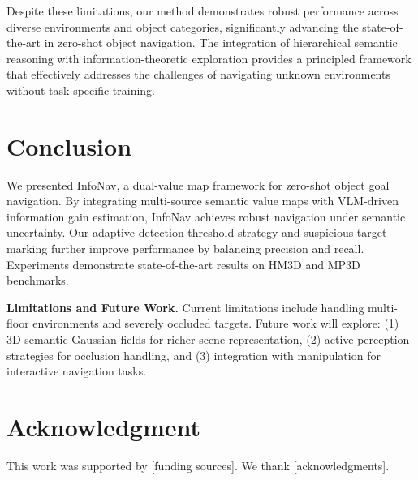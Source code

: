 \documentclass[conference]{IEEEtran}
\begin{document}
Despite these limitations, our method demonstrates robust performance across diverse environments and object categories, significantly advancing the state-of-the-art in zero-shot object navigation. The integration of hierarchical semantic reasoning with information-theoretic exploration provides a principled framework that effectively addresses the challenges of navigating unknown environments without task-specific training.

\section{Conclusion}
\label{sec:conclusion}

We presented InfoNav, a dual-value map framework for zero-shot object goal navigation. By integrating multi-source semantic value maps with VLM-driven information gain estimation, InfoNav achieves robust navigation under semantic uncertainty. Our adaptive detection threshold strategy and suspicious target marking further improve performance by balancing precision and recall. Experiments demonstrate state-of-the-art results on HM3D and MP3D benchmarks.

\textbf{Limitations and Future Work.} Current limitations include handling multi-floor environments and severely occluded targets. Future work will explore: (1) 3D semantic Gaussian fields for richer scene representation, (2) active perception strategies for occlusion handling, and (3) integration with manipulation for interactive navigation tasks.

\section*{Acknowledgment}

This work was supported by [funding sources]. We thank [acknowledgments].



\end{document}
